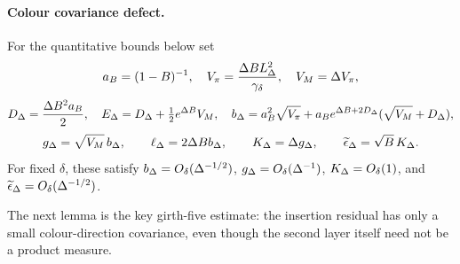 \paragraph{Colour covariance defect.}
For the quantitative bounds below set
\[
 a_B=(1-B)^{-1},\quad V_\pi=\frac{\Delta B L_\Delta^2}{\gamma_\delta},\quad
 V_M=\Delta V_\pi,
\]
\[
 D_\Delta=\frac{\Delta B^2a_B}{2},\quad
 E_\Delta=D_\Delta+\tfrac12e^{\Delta B}V_M,\quad
 b_\Delta=a_B^2\sqrt{V_\pi}+a_Be^{\Delta B+2D_\Delta}
 (\sqrt{V_M}+D_\Delta),
\]
\begin{equation}\label{eq:girth5-defect-constants}
 g_\Delta=\sqrt{V_M}\,b_\Delta,\qquad
 \ell_\Delta=2\Delta B b_\Delta,\qquad K_\Delta=\Delta g_\Delta,\qquad
 \widetilde\epsilon_\Delta=\sqrt B\,K_\Delta.
\end{equation}
For fixed $\delta$, these satisfy
$b_\Delta=O_\delta(\Delta^{-1/2})$, $g_\Delta=O_\delta(\Delta^{-1})$,
$K_\Delta=O_\delta(1)$, and
$\widetilde\epsilon_\Delta=O_\delta(\Delta^{-1/2})$.

The next lemma is the key girth-five estimate: the insertion residual has
only a small colour-direction covariance, even though the second layer itself
need not be a product measure.


